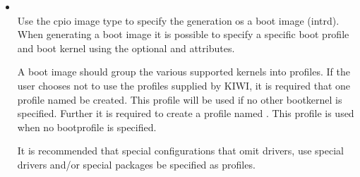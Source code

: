 \begin{itemize}
\item {}\\
      Use the cpio image type to specify the generation os a boot image
      (intrd). When generating a boot image it is possible to specify a
      specific boot profile and boot kernel using the optional
       and 
      attributes.
      
      A boot image should group the various supported kernels into profiles. 
      If the user chooses not to use the profiles supplied by KIWI, it is
      required that one profile named  be created. This profile
      will be used if no other bootkernel is specified. Further it is 
      required to create a  profile named . This profile is
      used when no bootprofile is specified.

      It is recommended that special configurations that omit drivers, use
      special drivers and/or special packages be specified as profiles.



\end{itemize}

